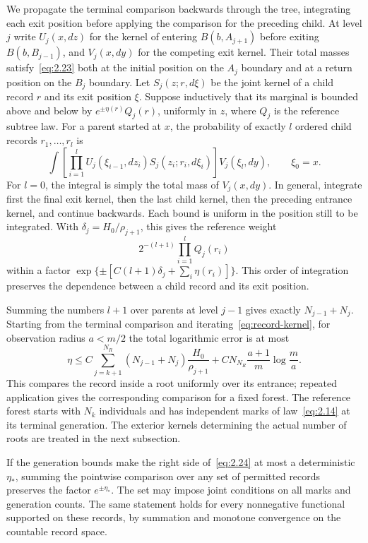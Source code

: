 \documentclass[11pt,a4paper]{article}
\numberwithin{equation}{section}
\theoremstyle{remark}
\begin{document}
We propagate the terminal comparison backwards through the tree, integrating each exit position before applying the comparison for the preceding child. At level $j$ write $U_j(x,dz)$ for the kernel of entering $B(b,A_{j+1})$ before exiting $B(b,B_{j-1})$, and $V_j(x,dy)$ for the competing exit kernel. Their total masses satisfy~\eqref{eq:2.23} both at the initial position on the $A_j$ boundary and at a return position on the $B_j$ boundary. Let $S_j(z;r,d\xi)$ be the joint kernel of a child record $r$ and its exit position $\xi$. Suppose inductively that its marginal is bounded above and below by $e^{\pm\eta(r)}Q_j(r)$, uniformly in $z$, where $Q_j$ is the reference subtree law. For a parent started at $x$, the probability of exactly $l$ ordered child records $r_1,\ldots,r_l$ is
\begin{equation}\label{eq:record-kernel}
\int\left[\prod_{i=1}^l
U_j(\xi_{i-1},dz_i)S_j(z_i;r_i,d\xi_i)\right]
V_j(\xi_l,dy),\qquad \xi_0=x.
\end{equation}
For $l=0$, the integral is simply the total mass of $V_j(x,dy)$. In general, integrate first the final exit kernel, then the last child kernel, then the preceding entrance kernel, and continue backwards. Each bound is uniform in the position still to be integrated. With $\delta_j=H_0/\rho_{j+1}$, this gives the reference weight
\[
2^{-(l+1)}\prod_{i=1}^lQ_j(r_i)
\]
within a factor $\exp\{\pm[C(l+1)\delta_j+\sum_i\eta(r_i)]\}$. This order of integration preserves the dependence between a child record and its exit position.

Summing the numbers $l+1$ over parents at level $j-1$ gives exactly $N_{j-1}+N_j$. Starting from the terminal comparison and iterating~\eqref{eq:record-kernel}, for observation radius $a<m/2$ the total logarithmic error is at most
\begin{equation}\label{eq:2.24}
\eta\le
C\sum_{j=k+1}^{N_R}(N_{j-1}+N_j)\frac{H_0}{\rho_{j+1}}
+CN_{N_R}\frac{a+1}{m}\log\frac ma.
\end{equation}
This compares the record inside a root uniformly over its entrance; repeated application gives the corresponding comparison for a fixed forest. The reference forest starts with $N_k$ individuals and has independent marks of law~\eqref{eq:2.14} at its terminal generation. The exterior kernels determining the actual number of roots are treated in the next subsection.

If the generation bounds make the right side of~\eqref{eq:2.24} at most a deterministic $\eta_*$, summing the pointwise comparison over any set of permitted records preserves the factor $e^{\pm\eta_*}$. The set may impose joint conditions on all marks and generation counts. The same statement holds for every nonnegative functional supported on these records, by summation and monotone convergence on the countable record space.
\end{document}
